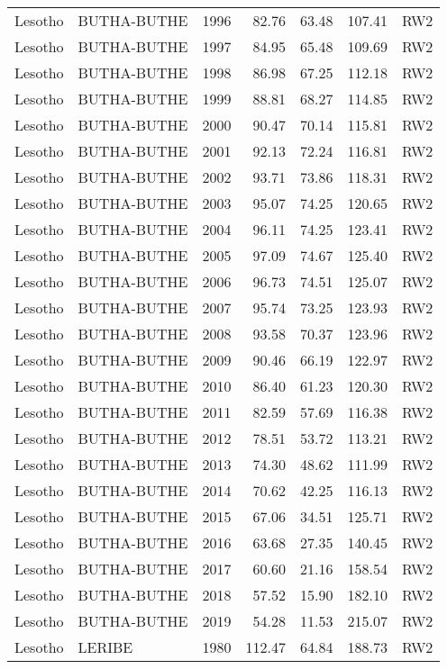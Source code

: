 \begin{longtable}{lllrrrl}
  Lesotho & BUTHA-BUTHE & 1996 & 82.76 & 63.48 & 107.41 & RW2 \\ 
  Lesotho & BUTHA-BUTHE & 1997 & 84.95 & 65.48 & 109.69 & RW2 \\ 
  Lesotho & BUTHA-BUTHE & 1998 & 86.98 & 67.25 & 112.18 & RW2 \\ 
  Lesotho & BUTHA-BUTHE & 1999 & 88.81 & 68.27 & 114.85 & RW2 \\ 
  Lesotho & BUTHA-BUTHE & 2000 & 90.47 & 70.14 & 115.81 & RW2 \\ 
  Lesotho & BUTHA-BUTHE & 2001 & 92.13 & 72.24 & 116.81 & RW2 \\ 
  Lesotho & BUTHA-BUTHE & 2002 & 93.71 & 73.86 & 118.31 & RW2 \\ 
  Lesotho & BUTHA-BUTHE & 2003 & 95.07 & 74.25 & 120.65 & RW2 \\ 
  Lesotho & BUTHA-BUTHE & 2004 & 96.11 & 74.25 & 123.41 & RW2 \\ 
  Lesotho & BUTHA-BUTHE & 2005 & 97.09 & 74.67 & 125.40 & RW2 \\ 
  Lesotho & BUTHA-BUTHE & 2006 & 96.73 & 74.51 & 125.07 & RW2 \\ 
  Lesotho & BUTHA-BUTHE & 2007 & 95.74 & 73.25 & 123.93 & RW2 \\ 
  Lesotho & BUTHA-BUTHE & 2008 & 93.58 & 70.37 & 123.96 & RW2 \\ 
  Lesotho & BUTHA-BUTHE & 2009 & 90.46 & 66.19 & 122.97 & RW2 \\ 
  Lesotho & BUTHA-BUTHE & 2010 & 86.40 & 61.23 & 120.30 & RW2 \\ 
  Lesotho & BUTHA-BUTHE & 2011 & 82.59 & 57.69 & 116.38 & RW2 \\ 
  Lesotho & BUTHA-BUTHE & 2012 & 78.51 & 53.72 & 113.21 & RW2 \\ 
  Lesotho & BUTHA-BUTHE & 2013 & 74.30 & 48.62 & 111.99 & RW2 \\ 
  Lesotho & BUTHA-BUTHE & 2014 & 70.62 & 42.25 & 116.13 & RW2 \\ 
  Lesotho & BUTHA-BUTHE & 2015 & 67.06 & 34.51 & 125.71 & RW2 \\ 
  Lesotho & BUTHA-BUTHE & 2016 & 63.68 & 27.35 & 140.45 & RW2 \\ 
  Lesotho & BUTHA-BUTHE & 2017 & 60.60 & 21.16 & 158.54 & RW2 \\ 
  Lesotho & BUTHA-BUTHE & 2018 & 57.52 & 15.90 & 182.10 & RW2 \\ 
  Lesotho & BUTHA-BUTHE & 2019 & 54.28 & 11.53 & 215.07 & RW2 \\ 
  Lesotho & LERIBE & 1980 & 112.47 & 64.84 & 188.73 & RW2 \\ 

\end{longtable}
